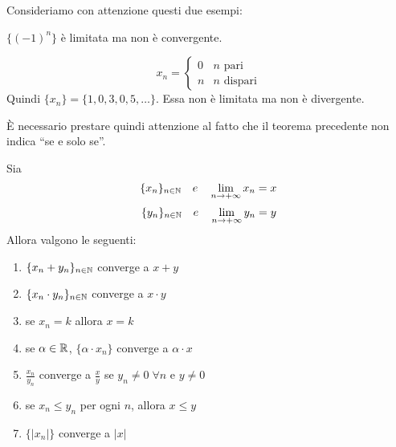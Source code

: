 Consideriamo con attenzione questi due esempi: 
\begin{example}
$\{(-1)^n\}$ è limitata ma non è convergente.
\end{example}
\begin{example}
\begin{equation*}
x_n = \begin{cases} 0 &n \mbox{ pari} \\ n &n \mbox{ dispari} \end{cases}
\end{equation*}
Quindi $\{x_n\} = \{1, 0, 3, 0, 5, \ldots\}$. Essa non è limitata ma non è divergente.
\end{example}

È necessario prestare quindi attenzione al fatto che il teorema precedente non indica ``se e solo se''.

\begin{theorem}
Sia
\begin{equation*}
\{x_n\}_{n \in \mathbb N} \quad e \quad \lim_{n \to +\infty} x_n = x
\end{equation*}
\begin{equation*}
\{y_n\}_{n \in \mathbb N} \quad e \quad \lim_{n \to +\infty} y_n = y
\end{equation*}
Allora valgono le seguenti:
\begin{enumerate}
\item $\{x_n + y_n\}_{n \in \mathbb N}$ converge a $x+y$
\item $\{x_n \cdot y_n\}_{n \in \mathbb N}$ converge a $x\cdot y$
\item se $x_n = k$ allora $x = k$
\item se $\alpha \in \mathbb R$, $\{\alpha \cdot x_n\}$ converge a $\alpha \cdot x$
\item $\frac{x_n}{y_n}$ converge a $\frac{x}{y}$ se $y_n \neq 0 \; \forall n$ e $y \neq 0$
\item se $x_n \le y_n$ per ogni $n$, allora $x \le y$
\item $\{|x_n|\}$ converge a $|x|$
\end{enumerate}
\end{theorem}

